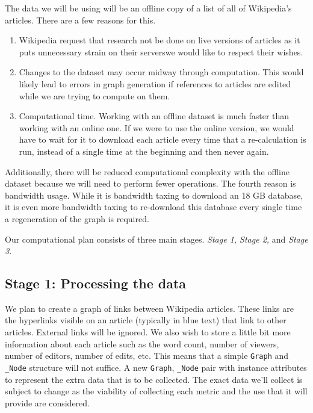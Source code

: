 \documentclass[fontsize=12pt]{article}
\begin{document}
\begin{multicols}{2}
    The data we will be using will be an offline copy of a list of all of Wikipedia's articles. There are a few reasons for this. \begin{enumerate}
        \item Wikipedia request that research not be done on live versions of articles as it puts unnecessary strain on their servers\textemdash we would like to respect their wishes.
        \item Changes to the dataset may occur midway through computation. This would likely lead to errors in graph generation if references to articles are edited while we are trying to compute on them.
        \item Computational time. Working with an offline dataset is much faster than working with an online one. If we were to use the online version, we would have to wait for it to download each article every time that a re-calculation is run, instead of a single time at the beginning and then never again.
    \end{enumerate}
    Additionally, there will be reduced computational complexity with the offline dataset because we will need to perform fewer operations. The fourth reason is bandwidth usage. While it is bandwidth taxing to download an 18 GB database, it is even more bandwidth taxing to re-download this database every single time a regeneration of the graph is required.
    
    
    Our computational plan consists of three main stages. \textit{Stage 1, Stage 2,} and \textit{Stage 3}.
    
    \subsection{Stage 1: Processing the data}
    We plan to create a graph of links between Wikipedia articles. These links are the hyperlinks visible on an article (typically in blue text) that link to other articles. External links will be ignored. We also wish to store a little bit more information about each article such as the word count, number of viewers, number of editors, number of edits, etc. This means that a simple \texttt{Graph} and \texttt{\_Node} structure will not suffice. A new \texttt{Graph}, \texttt{\_Node} pair with instance attributes to represent the extra data that is to be collected. The exact data we'll collect is subject to change as the viability of collecting each metric and the use that it will provide are considered. 
    

\end{multicols}
\end{document}
